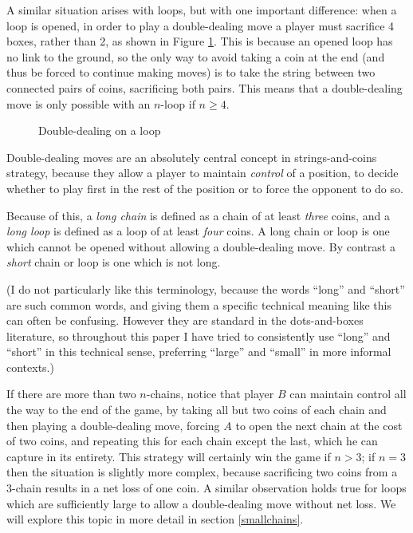 \documentclass[a4paper,twocolumn]{article}
\begin{document}
A similar situation arises with loops, but with one important
difference: when a loop is opened, in order to play a double-dealing
move a player must sacrifice 4 boxes, rather than 2, as shown in
Figure \ref{loopdoubledeal}. This is because an opened loop has no
link to the ground, so the only way to avoid taking a coin at the end
(and thus be forced to continue making moves) is to take the string
between two connected pairs of coins, sacrificing both pairs. This
means that a double-dealing move is only possible with an $n$-loop if
$n \ge 4$.

\begin{figure}
  \centering
  \def\svgscale{0.7}
  
  \caption{Double-dealing on a loop}
  \label{loopdoubledeal}
\end{figure}

Double-dealing moves are an absolutely central concept in
strings-and-coins strategy, because they allow a player to maintain
\emph{control} of a position, to decide whether to play first in the
rest of the position or to force the opponent to do so.

Because of this, a \emph{long chain} is defined as a chain of at least
\emph{three} coins, and a \emph{long loop} is defined as a loop of at
least \emph{four} coins. A long chain or loop is one which cannot be
opened without allowing a double-dealing move. By contrast a
\emph{short} chain or loop is one which is not long.

(I do not particularly like this terminology, because the words
``long'' and ``short'' are such common words, and giving them a
specific technical meaning like this can often be confusing. However
they are standard in the dots-and-boxes literature, so throughout this
paper I have tried to consistently use ``long'' and ``short'' in this
technical sense, preferring ``large'' and ``small'' in more informal
contexts.)

If there are more than two $n$-chains, notice that player $B$ can
maintain control all the way to the end of the game, by taking all but
two coins of each chain and then playing a double-dealing move,
forcing $A$ to open the next chain at the cost of two coins, and
repeating this for each chain except the last, which he can capture in
its entirety. This strategy will certainly win the game if $n>3$; if
$n=3$ then the situation is slightly more complex, because sacrificing
two coins from a 3-chain results in a net loss of one coin. A similar
observation holds true for loops which are sufficiently large to allow
a double-dealing move without net loss. We will explore this topic in
more detail in section \ref{smallchains}.
\end{document}
